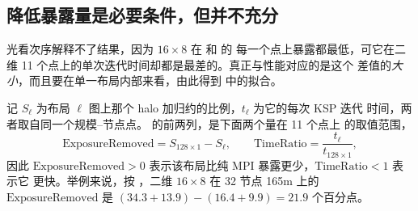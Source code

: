 \documentclass[11pt,a4paper,oneside]{report}
\let\OldSubsection\subsection
\renewcommand{\subsection}{\FloatBarrier\OldSubsection}
\begin{document}
\subsection{降低暴露量是必要条件，但并不充分}
\label{sec:sync-breakeven}
光看次序解释不了结果，因为 $16\times8$ 在  和  的
每一个点上暴露都最低，可它在二维 11 个点上的单次迭代时间却都是最差的。真正与性能对应的是这个
差值的\emph{大小}，而且要在单一布局内部来看，由此得到  中的拟合。

记 $S_\ell$ 为布局 $\ell$ 图上那个 halo 加归约的比例，$t_\ell$ 为它的每次 KSP 迭代
时间，两者取自同一个规模--节点点。 的前两列，是下面两个量在 11 个点上
的取值范围，
\[
  \mathrm{ExposureRemoved} = S_{128\times1} - S_\ell, \qquad
  \mathrm{TimeRatio} = \frac{t_\ell}{t_{128\times1}},
\]
因此 $\mathrm{ExposureRemoved}>0$ 表示该布局比纯 MPI 暴露更少，$\mathrm{TimeRatio}<1$ 表示它
更快。举例来说，按 ，二维 $16\times8$ 在 32 节点 165m 上的
$\mathrm{ExposureRemoved}$ 是 $(34.3+13.9)-(16.4+9.9)=21.9$ 个百分点。
\end{document}
